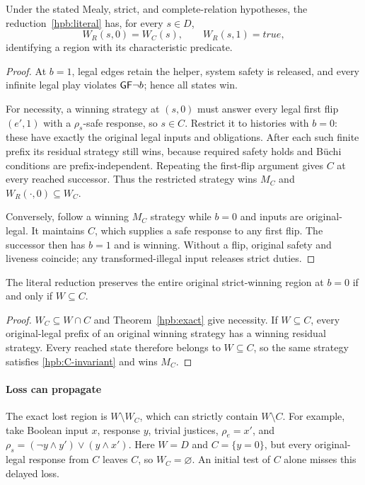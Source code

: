 \begin{theorem}
\label{hpb:exact}
Under the stated Mealy, strict, and complete-relation hypotheses,
the reduction~\eqref{hpb:literal} has, for every $s\in D$,
\begin{equation}
 W_R(s,0)=W_C(s),\qquad W_R(s,1)=\mathit{true},
 \label{hpb:exact-equation}
\end{equation}
identifying a region with its characteristic predicate.
\end{theorem}
\begin{proof}
At $b=1$, legal edges retain the helper, system safety is released,
and every infinite legal play violates $\mathsf{G}\mathsf{F}\neg b$; hence all states win.

For necessity, a winning strategy at $(s,0)$ must answer every legal
first flip $(e',1)$ with a $\rho_s$-safe response, so $s\in C$.
Restrict it to histories with $b=0$: these have exactly the original
legal inputs and obligations. After each such finite prefix its
residual strategy still wins, because required safety holds and
B\"uchi conditions are prefix-independent. Repeating the first-flip
argument gives $C$ at every reached successor. Thus the restricted
strategy wins $M_C$ and $W_R(\cdot,0)\subseteq W_C$.

Conversely, follow a winning $M_C$ strategy while $b=0$ and inputs
are original-legal. It maintains $C$, which supplies a safe response
to any first flip. The successor then has $b=1$ and is winning.
Without a flip, original safety and liveness coincide; any
transformed-illegal input releases strict duties.
\end{proof}

\begin{corollary}
\label{hpb:full-preservation}
The literal reduction preserves the entire original strict-winning
region at $b=0$ if and only if $W\subseteq C$.
\end{corollary}
\begin{proof}
$W_C\subseteq W\cap C$ and Theorem~\ref{hpb:exact} give necessity.
If $W\subseteq C$, every original-legal prefix of an original winning
strategy has a winning residual strategy. Every reached state therefore
belongs to $W\subseteq C$, so the same strategy satisfies
\eqref{hpb:C-invariant} and wins $M_C$.
\end{proof}

\paragraph{Loss can propagate}
The exact lost region is $W\setminus W_C$, which can strictly contain
$W\setminus C$. For example, take Boolean input $x$, response $y$,
trivial justices, $\rho_e=x'$, and
$\rho_s=(\neg y\land y')\lor(y\land x')$.
Here $W=D$ and $C=\{y=0\}$, but every original-legal response from
$C$ leaves $C$, so $W_C=\varnothing$. An initial test of $C$ alone
misses this delayed loss.

